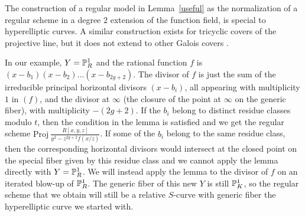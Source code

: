 \begin{remark}
 \textup{The construction of a regular model in Lemma~\ref{useful} as the normalization of a regular scheme in a degree $2$ extension of the function field, is special to hyperelliptic curves. A similar construction exists for tricyclic covers of the projective line, but it does not extend to other Galois covers {\cite{liulor}}. }
\end{remark}

In our example, $Y = \P^1_R$ and the rational function $f$ is $(x-b_1 )(x-b_2 ) \ldots (x-b_{2g+2} )$. The divisor of $f$ is just the sum of the irreducible principal horizontal divisors $(x-b_i )$, all appearing with multiplicity $1$ in $(f)$, and the divisor at $\infty$ (the closure of the point at $\infty$ on the generic fiber), with multiplicity $-(2g+2)$. If the $b_i$ belong to distinct residue classes modulo $t$, then the condition in the lemma is satisfied and we get the regular scheme $\mathrm{Proj}\ \frac{R[x,y,z]}{y^2-z^{2g+2}f(x/z)}$. If some of the $b_i$ belong to the same residue class, then the corresponding horizontal divisors would intersect at the closed point on the special fiber given by this residue class and we cannot apply the lemma directly with $Y = \P^1_R$. We will instead apply the lemma to the divisor of $f$ on an iterated blow-up of $\P^1_R$. The generic fiber of this new $Y$ is still $\P^1_K$, so the regular scheme that we obtain will still be a relative $S$-curve with generic fiber the hyperelliptic curve we started with. 

